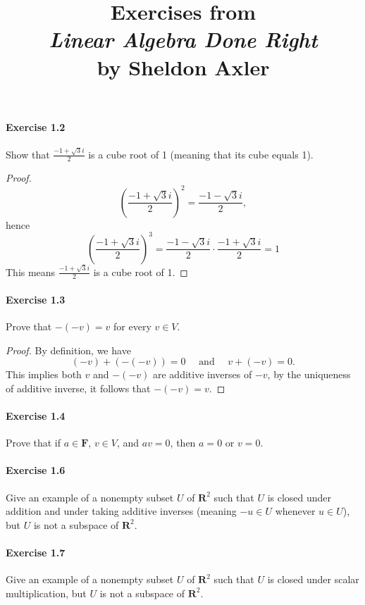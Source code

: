 \documentclass{article}
\title{\textbf{
Exercises from \\
\textit{Linear Algebra Done Right} \\
by Sheldon Axler
}}
\date{}
\theoremstyle{definition}
\begin{document}
\maketitle

\paragraph{Exercise 1.2} Show that $\frac{-1 + \sqrt{3}i}{2}$ is a cube root of 1 (meaning that its cube equals 1).
\begin{proof}
$$
\left(\frac{-1+\sqrt{3} i}{2}\right)^2=\frac{-1-\sqrt{3} i}{2},
$$
hence
$$
\left(\frac{-1+\sqrt{3} i}{2}\right)^3=\frac{-1-\sqrt{3} i}{2} \cdot \frac{-1+\sqrt{3} i}{2}=1
$$
This means $\frac{-1+\sqrt{3} i}{2}$ is a cube root of 1.
\end{proof}


\paragraph{Exercise 1.3} Prove that $-(-v) = v$ for every $v \in V$.
\begin{proof}
    By definition, we have
$$
(-v)+(-(-v))=0 \quad \text { and } \quad v+(-v)=0 .
$$
This implies both $v$ and $-(-v)$ are additive inverses of $-v$, by the uniqueness of additive inverse, it follows that $-(-v)=v$.
\end{proof}


\paragraph{Exercise 1.4} Prove that if $a \in \mathbf{F}$, $v \in V$, and $av = 0$, then $a = 0$ or $v = 0$.

\paragraph{Exercise 1.6} Give an example of a nonempty subset $U$ of $\mathbf{R}^2$ such that $U$ is closed under addition and under taking additive inverses (meaning $-u \in U$ whenever $u \in U$), but $U$ is not a subspace of $\mathbf{R}^2$.

\paragraph{Exercise 1.7} Give an example of a nonempty subset $U$ of $\mathbf{R}^2$ such that $U$ is closed under scalar multiplication, but $U$ is not a subspace of $\mathbf{R}^2$.
\end{document}
